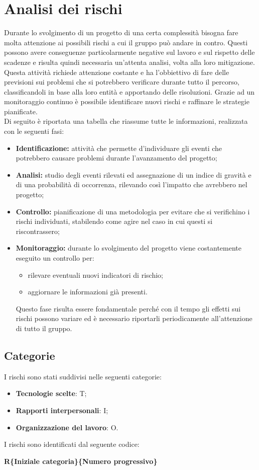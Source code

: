 \section{Analisi dei rischi}
Durante lo svolgimento di un progetto di una certa complessità bisogna fare molta attenzione ai possibili rischi a cui il gruppo può andare in contro. Questi possono avere conseguenze particolarmente negative sul lavoro e sul rispetto delle scadenze e risulta quindi necessaria un'attenta analisi, volta alla loro mitigazione.\\Questa attività richiede attenzione costante e ha l'obbiettivo di fare delle previsioni sui problemi che si potrebbero verificare durante tutto il percorso, classificandoli in base alla loro entità e apportando delle risoluzioni. Grazie ad un monitoraggio continuo è possibile identificare nuovi rischi e raffinare le strategie pianificate.\\
Di seguito è riportata una tabella che riassume tutte le informazioni, realizzata con le seguenti fasi:
\begin{itemize}
\item \textbf{Identificazione:} attività che permette d'individuare gli eventi che potrebbero causare problemi durante l'avanzamento del progetto;
\item \textbf{Analisi:} studio degli eventi rilevati ed assegnazione di un indice di gravità e di una probabilità di occorrenza, rilevando così l'impatto che avrebbero nel progetto;
\item \textbf{Controllo:} pianificazione di una metodologia per evitare che
si verifichino i rischi individuati, stabilendo come agire nel caso in cui questi si riscontrassero;
\item \textbf{Monitoraggio:} durante lo svolgimento del progetto viene costantemente eseguito un controllo per:
	\begin{itemize}
		\item rilevare eventuali nuovi indicatori di rischio;
		\item aggiornare le informazioni già presenti.
	\end{itemize}
Questo fase risulta essere fondamentale perché con il tempo gli effetti sui rischi possono variare ed è necessario riportarli periodicamente all'attenzione di tutto il gruppo.
\end{itemize}

\subsection{Categorie}
I rischi sono stati suddivisi nelle seguenti categorie:
\begin{itemize}
\item \textbf{Tecnologie scelte}: T;
\item \textbf{Rapporti interpersonali}: I;
\item \textbf{Organizzazione del lavoro}: O.
\end{itemize}
I rischi sono identificati dal seguente codice:
\begin{center}
	\textbf{R\{Iniziale categoria\}\{Numero progressivo\}}
\end{center}
